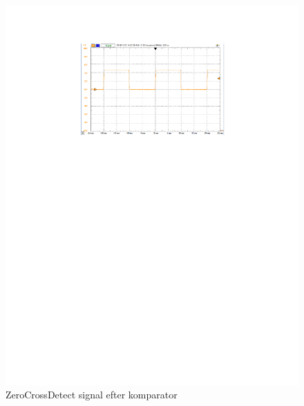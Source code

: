 \begin{figure}[h]
	\centering
	\includegraphics[width={\textwidth},trim=150 520 145 80, clip=true]{../Implementering/billeder/zerocrossdetector.pdf}
	\caption{ZeroCrossDetect signal efter komparator}
	\label{fig:ZC_Signal}
\end{figure}
\newpage